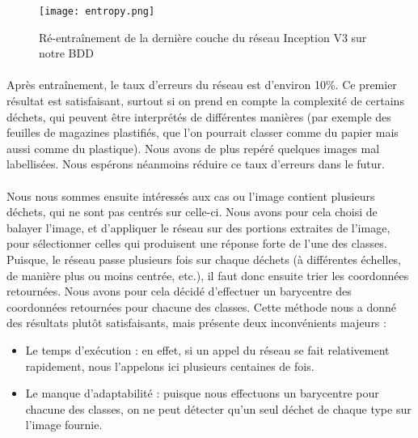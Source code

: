 \documentclass[12pt,a4paper,twocolumn]{article}
\begin{document}
\begin{figure}[H]
	\center
	\texttt{[image: entropy.png]}
	\caption{Ré-entraînement de la dernière couche du réseau Inception V3 sur notre BDD}
	\label{entropy}
\end{figure}

\paragraph*{}

Après entraînement, le taux d’erreurs du réseau est d’environ 10\%. Ce premier résultat est satisfaisant, surtout si on prend en compte la complexité de certains déchets, qui peuvent être interprétés de différentes manières (par exemple des feuilles de magazines plastifiés, que l’on pourrait classer comme du papier mais aussi comme du plastique). Nous avons de plus repéré quelques images mal labellisées. Nous espérons néanmoins réduire ce taux d’erreurs dans le futur.

\paragraph*{}

Nous nous sommes ensuite intéressés aux cas ou l’image contient plusieurs déchets, qui ne sont pas centrés sur celle-ci. Nous avons pour cela choisi de balayer l’image, et d’appliquer le réseau sur des portions extraites de l’image, pour sélectionner celles qui produisent une réponse forte de l’une des classes. Puisque, le réseau passe plusieurs fois sur chaque déchets (à différentes échelles, de manière plus ou moins centrée, etc.), il faut donc ensuite trier les coordonnées retournées. Nous avons pour cela décidé d’effectuer un barycentre des coordonnées retournées pour chacune des classes.
Cette méthode nous a donné des résultats plutôt satisfaisants, mais présente deux inconvénients majeurs :
\begin{itemize}
  \item Le temps d’exécution : en effet, si un appel du réseau se fait relativement rapidement, nous l’appelons ici plusieurs centaines de fois.
  \item Le manque d'adaptabilité : puisque nous effectuons un barycentre pour chacune des classes, on ne peut détecter qu’un seul déchet de chaque type sur l’image fournie.
\end{itemize}

\paragraph*{}
\end{document}
